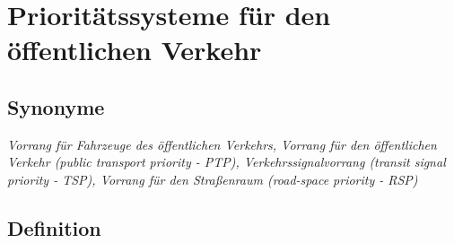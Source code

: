 \documentclass[
]{book}
\begin{document}
\hypertarget{public_trans_priority}{%
\section{Prioritätssysteme für den öffentlichen Verkehr}\label{public_trans_priority}}

\hypertarget{synonyme-5}{%
\subsection*{Synonyme}\label{synonyme-5}}

\emph{Vorrang für Fahrzeuge des öffentlichen Verkehrs, Vorrang für den öffentlichen Verkehr (public transport priority - PTP), Verkehrssignalvorrang (transit signal priority - TSP), Vorrang für den Straßenraum (road-space priority - RSP)}

\hypertarget{definition-5}{%
\subsection*{Definition}\label{definition-5}}
\end{document}
